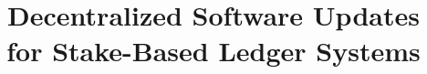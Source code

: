 \title{Decentralized Software Updates\\for Stake-Based Ledger Systems}
\author{}

\institute{}

%

\maketitle
